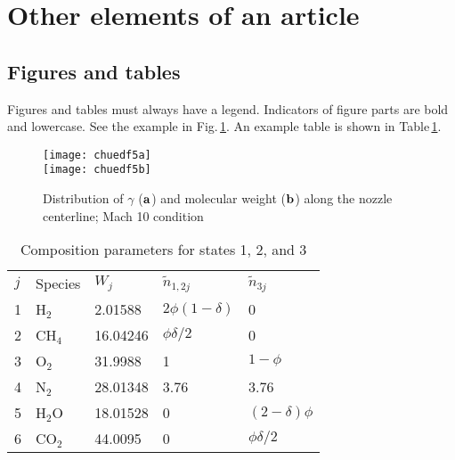 \documentclass[twocolumn]{svjour3}          %
\begin{document}
\section{Other elements of an article}

\subsection{Figures and tables}

Figures and tables must always have a legend. Indicators of figure
parts are bold and lowercase. See the example in
Fig.\,\ref{chue_dgc_fig5}. An example table is shown in
Table\,\ref{tab:1}.

\begin{figure}
{}
{\texttt{[image: chuedf5a]}\\[8pt]}
{\texttt{[image: chuedf5b]}}
%
\caption{Distribution of $\gamma$ (${\bf a}$) and molecular weight
(${\bf b}$) along the nozzle centerline; Mach 10 condition}
\label{chue_dgc_fig5}
\end{figure}

\begin{table}
\caption{Composition parameters for states 1, 2, and 3}
\label{tab:1}       %
\centering
\begin{tabular}{@{}lllll@{}}
\hline\noalign{\smallskip}
$j$ & Species & $W_j$ & $\tilde n_{1,2j}$ & $\tilde n_{3j}$ \\[2pt]
\tableheadseprule\noalign{\smallskip}
1 & H$_{2} $ &  2.01588 & $2 \phi (1 - \delta)$      & 0 \\
2 & CH$_{4}$ & 16.04246 & $ \phi\delta /2$           & 0 \\
3 & O$_{2} $ & 31.9988  & 1                          & $1-\phi$ \\
4 & N$_{2} $ & 28.01348 & 3.76                       & 3.76 \\
5 & H$_{2} $O & 18.01528 & 0                          & $(2 -
\delta)
\phi$ \\
6 & CO$_{2}$ & 44.0095  & 0                          & $\phi
\delta /2$
\\[1pt]\hline
\end{tabular}
\end{table}
\end{document}
